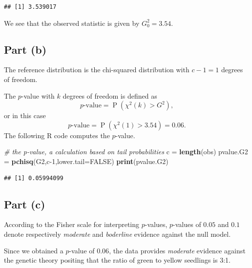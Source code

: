 \documentclass[
]{article}
\newenvironment{Shaded}{\begin{snugshade}}{\end{snugshade}}
\newcommand{\AttributeTok}[1]{\textcolor[rgb]{0.13,0.29,0.53}{#1}}
\newcommand{\CommentTok}[1]{\textcolor[rgb]{0.56,0.35,0.01}{\textit{#1}}}
\newcommand{\ConstantTok}[1]{\textcolor[rgb]{0.56,0.35,0.01}{#1}}
\newcommand{\DecValTok}[1]{\textcolor[rgb]{0.00,0.00,0.81}{#1}}
\newcommand{\FunctionTok}[1]{\textcolor[rgb]{0.13,0.29,0.53}{\textbf{#1}}}
\newcommand{\NormalTok}[1]{#1}
\newcommand{\OtherTok}[1]{\textcolor[rgb]{0.56,0.35,0.01}{#1}}
\begin{document}
\begin{verbatim}
## [1] 3.539017
\end{verbatim}

We see that the observed statistic is given by \(G_0^2 = 3.54\).

\hypertarget{part-b}{%
\subsection{Part (b)}\label{part-b}}


The reference distribution is the chi-squared distribution with
\(c-1 = 1\) degrees of freedom.

The \(p\)-value with \(k\) degrees of freedom is defined as \[
  \text{$p$-value} = \operatorname{P}(\chi^2(k) > G^2),
\] or in this case \[
  \text{$p$-value} = \operatorname{P}(\chi^2(1) > 3.54) = 0.06.
\] The following R code computes the \(p\)-value.

\begin{Shaded}
\begin{Highlighting}[]
\CommentTok{\# the p{-}value, a calculation based on tail probabilities}
\NormalTok{c }\OtherTok{=} \FunctionTok{length}\NormalTok{(obs)}
\NormalTok{pvalue.G2 }\OtherTok{=} \FunctionTok{pchisq}\NormalTok{(G2,c}\DecValTok{{-}1}\NormalTok{,}\AttributeTok{lower.tail=}\ConstantTok{FALSE}\NormalTok{)}
\FunctionTok{print}\NormalTok{(pvalue.G2)}
\end{Highlighting}
\end{Shaded}

\begin{verbatim}
## [1] 0.05994099
\end{verbatim}

\hypertarget{part-c}{%
\subsection{Part (c)}\label{part-c}}


According to the Fisher scale for interpreting \(p\)-values,
\(p\)-values of \(0.05\) and \(0.1\) denote respectively \emph{moderate}
and \emph{boderline} evidence against the null model.

Since we obtained a \(p\)-value of \(0.06\), the data provides
\emph{moderate} evidence against the genetic theory positing that the
ratio of green to yellow seedlings is 3:1.
\end{document}
